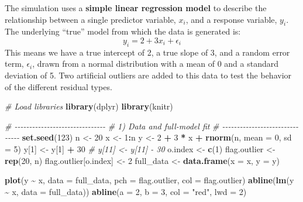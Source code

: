 \documentclass[
]{article}
\newenvironment{Shaded}{\begin{snugshade}}{\end{snugshade}}
\newcommand{\AttributeTok}[1]{\textcolor[rgb]{0.13,0.29,0.53}{#1}}
\newcommand{\CommentTok}[1]{\textcolor[rgb]{0.56,0.35,0.01}{\textit{#1}}}
\newcommand{\DecValTok}[1]{\textcolor[rgb]{0.00,0.00,0.81}{#1}}
\newcommand{\FunctionTok}[1]{\textcolor[rgb]{0.13,0.29,0.53}{\textbf{#1}}}
\newcommand{\NormalTok}[1]{#1}
\newcommand{\OtherTok}[1]{\textcolor[rgb]{0.56,0.35,0.01}{#1}}
\newcommand{\SpecialCharTok}[1]{\textcolor[rgb]{0.81,0.36,0.00}{\textbf{#1}}}
\newcommand{\StringTok}[1]{\textcolor[rgb]{0.31,0.60,0.02}{#1}}
\begin{document}
The simulation uses a \textbf{simple linear regression model} to
describe the relationship between a single predictor variable, \(x_i\),
and a response variable, \(y_i\). The underlying ``true'' model from
which the data is generated is: \[y_i = 2 + 3x_i + \epsilon_i\] This
means we have a true intercept of 2, a true slope of 3, and a random
error term, \(\epsilon_i\), drawn from a normal distribution with a mean
of 0 and a standard deviation of 5. Two artificial outliers are added to
this data to test the behavior of the different residual types.

\begin{Shaded}
\begin{Highlighting}[]
\CommentTok{\# Load libraries}
\FunctionTok{library}\NormalTok{(dplyr)}
\FunctionTok{library}\NormalTok{(knitr)}

\CommentTok{\# {-}{-}{-}{-}{-}{-}{-}{-}{-}{-}{-}{-}{-}{-}{-}{-}{-}{-}{-}{-}{-}{-}{-}{-}{-}{-}{-}{-}{-}{-}{-}}
\CommentTok{\# 1) Data and full{-}model fit}
\CommentTok{\# {-}{-}{-}{-}{-}{-}{-}{-}{-}{-}{-}{-}{-}{-}{-}{-}{-}{-}{-}{-}{-}{-}{-}{-}{-}{-}{-}{-}{-}{-}{-}}
\FunctionTok{set.seed}\NormalTok{(}\DecValTok{123}\NormalTok{)}
\NormalTok{n }\OtherTok{\textless{}{-}} \DecValTok{20}
\NormalTok{x }\OtherTok{\textless{}{-}} \DecValTok{1}\SpecialCharTok{:}\NormalTok{n}
\NormalTok{y }\OtherTok{\textless{}{-}} \DecValTok{2} \SpecialCharTok{+} \DecValTok{3} \SpecialCharTok{*}\NormalTok{ x }\SpecialCharTok{+} \FunctionTok{rnorm}\NormalTok{(n, }\AttributeTok{mean =} \DecValTok{0}\NormalTok{, }\AttributeTok{sd =} \DecValTok{5}\NormalTok{)}
\NormalTok{y[}\DecValTok{1}\NormalTok{] }\OtherTok{\textless{}{-}}\NormalTok{ y[}\DecValTok{1}\NormalTok{] }\SpecialCharTok{+} \DecValTok{30}  
\CommentTok{\# y[11] \textless{}{-} y[11] {-} 30 }
\NormalTok{o.index }\OtherTok{\textless{}{-}} \FunctionTok{c}\NormalTok{(}\DecValTok{1}\NormalTok{)}
\NormalTok{flag.outlier }\OtherTok{\textless{}{-}} \FunctionTok{rep}\NormalTok{(}\DecValTok{20}\NormalTok{, n)}
\NormalTok{flag.outlier[o.index] }\OtherTok{\textless{}{-}} \DecValTok{2}
\NormalTok{full\_data  }\OtherTok{\textless{}{-}} \FunctionTok{data.frame}\NormalTok{(}\AttributeTok{x =}\NormalTok{ x, }\AttributeTok{y =}\NormalTok{ y)}

\FunctionTok{plot}\NormalTok{(y }\SpecialCharTok{\textasciitilde{}}\NormalTok{ x, }\AttributeTok{data =}\NormalTok{ full\_data, }\AttributeTok{pch =}\NormalTok{ flag.outlier, }\AttributeTok{col =}\NormalTok{ flag.outlier)}
\FunctionTok{abline}\NormalTok{(}\FunctionTok{lm}\NormalTok{(y }\SpecialCharTok{\textasciitilde{}}\NormalTok{ x, }\AttributeTok{data =}\NormalTok{ full\_data))}
\FunctionTok{abline}\NormalTok{(}\AttributeTok{a =} \DecValTok{2}\NormalTok{, }\AttributeTok{b =} \DecValTok{3}\NormalTok{, }\AttributeTok{col =} \StringTok{"red"}\NormalTok{, }\AttributeTok{lwd =} \DecValTok{2}\NormalTok{)}
\end{Highlighting}
\end{Shaded}
\end{document}
